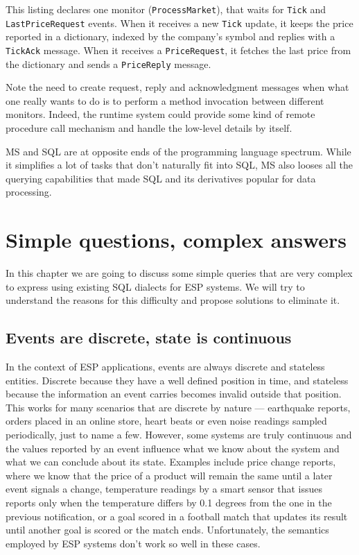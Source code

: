 \documentclass[a4,11pt]{report}
\begin{document}
This listing declares one monitor (\verb=ProcessMarket=), that waits
for \verb=Tick= and \verb=LastPriceRequest= events. When it receives a
new \verb=Tick= update, it keeps the price reported in a dictionary,
indexed by the company's symbol and replies with a \verb=TickAck=
message. When it receives a \verb=PriceRequest=, it fetches the last
price from the dictionary and sends a \verb=PriceReply= message.

Note the need to create request, reply and acknowledgment messages
when what one really wants to do is to perform a method invocation
between different monitors. Indeed, the runtime system could provide
some kind of remote procedure call mechanism and handle the low-level
details by itself.

MS and SQL are at opposite ends of the programming language
spectrum. While it simplifies a lot of tasks that don't naturally fit
into SQL, MS also looses all the querying capabilities that made SQL
and its derivatives popular for data processing.

\chapter{Simple questions, complex answers}
\label{chap:simple-questions-complex-answers}

In this chapter we are going to discuss some simple queries that are
very complex to express using existing SQL dialects for ESP
systems. We will try to understand the reasons for this difficulty and
propose solutions to eliminate it.

\section{Events are discrete, state is continuous}
\label{sec:acme-problem}

In the context of ESP applications, events are always discrete and
stateless entities. Discrete because they have a well defined position
in time, and stateless because the information an event carries
becomes invalid outside that position. This works for many scenarios
that are discrete by nature --- earthquake reports, orders placed in
an online store, heart beats or even noise readings sampled
periodically, just to name a few. However, some systems are truly
continuous and the values reported by an event influence what we know
about the system and what we can conclude about its state. Examples
include price change reports, where we know that the price of a
product will remain the same until a later event signals a change,
temperature readings by a smart sensor that issues reports only when
the temperature differs by 0.1 degrees from the one in the previous
notification, or a goal scored in a football match that updates its
result until another goal is scored or the match ends. Unfortunately,
the semantics employed by ESP systems don't work so well in these
cases.
\end{document}
